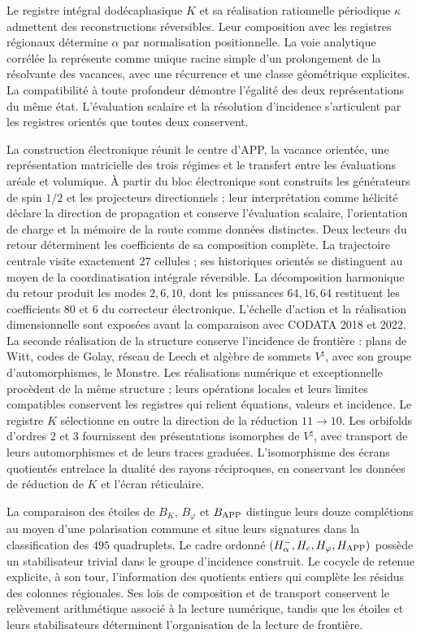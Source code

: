 Le registre intégral dodécaphasique \(K\) et sa réalisation rationnelle périodique
\(\kappa\) admettent des reconstructions réversibles. Leur composition avec les registres
régionaux détermine \(\alpha\) par normalisation positionnelle. La voie analytique
corrélée la représente comme unique racine simple d'un prolongement
de la résolvante des vacances, avec une récurrence et une classe géométrique explicites.
La compatibilité à toute profondeur démontre l'égalité des deux
représentations du même état. L'évaluation scalaire et la résolution d'incidence
s'articulent par les registres orientés que toutes deux conservent.

La construction électronique réunit le centre d'APP, la vacance orientée,
une représentation matricielle des trois régimes et le transfert entre
les évaluations aréale et volumique. À partir du bloc électronique sont construits
les générateurs de spin \(1/2\) et les projecteurs directionnels ; leur interprétation
comme hélicité déclare la direction de propagation et conserve l'évaluation
scalaire, l'orientation de charge et la mémoire de la route comme données distinctes.
Deux lecteurs du retour déterminent
les coefficients de sa composition complète. La trajectoire centrale visite
exactement \(27\) cellules ; ses historiques orientés se distinguent au moyen
de la coordinatisation intégrale réversible. La décomposition harmonique du retour
produit les modes \(2,6,10\), dont les puissances \(64,16,64\) restituent
les coefficients \(80\) et \(6\) du correcteur électronique.
L'échelle d'action et la
réalisation dimensionnelle sont exposées avant la comparaison avec CODATA 2018 et
2022. La seconde réalisation de la structure conserve l'incidence de
frontière : plans de Witt, codes de Golay, réseau de Leech et algèbre
de sommets \(V^\natural\), avec son groupe d'automorphismes, le Monstre.
Les réalisations numérique et exceptionnelle procèdent de la même structure ;
leurs opérations locales et leurs limites compatibles conservent les registres
qui relient équations, valeurs et incidence.
Le registre \(K\) sélectionne en outre la direction de la réduction
\(11\to10\). Les orbifolds d'ordres \(2\) et \(3\) fournissent
des présentations isomorphes de \(V^\natural\), avec transport de leurs
automorphismes et de leurs traces graduées. L'isomorphisme des écrans
quotientés entrelace la dualité des rayons réciproques, en conservant
les données de réduction de \(K\) et l'écran réticulaire.

La comparaison des étoiles de \(B_K\), \(B_\varphi\) et
\(B_{\rm APP}\) distingue leurs douze complétions au moyen d'une polarisation
commune et situe leurs signatures dans la classification des \(495\) quadruplets.
Le cadre ordonné \((H^-_\alpha,H_e,H_\varphi,H_{\rm APP})\) possède un
stabilisateur trivial dans le groupe d'incidence construit. Le cocycle
de retenue explicite, à son tour, l'information des quotients entiers
qui complète les résidus des colonnes régionales. Ses lois de
composition et de transport conservent le relèvement arithmétique associé
à la lecture numérique, tandis que les étoiles et leurs stabilisateurs
déterminent l'organisation de la lecture de frontière.

